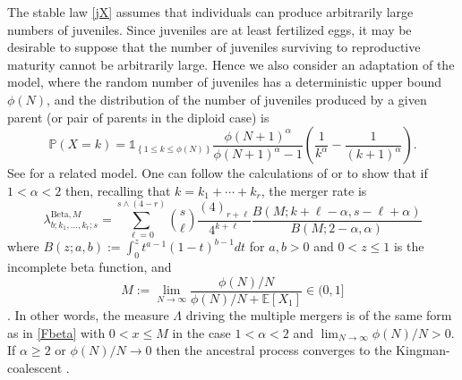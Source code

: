 \documentclass[9pt,twocolumn,twoside,lineno]{gsajnl}
\newcommand{\be}{\begin{equation}}
\newcommand{\ee}{\end{equation}}
\newcommand{\EE}[1]{\ensuremath{\mathds{E}\left[ #1 \right]}}%
\newcommand{\one}[1]{\ensuremath{\mathds{1}_{\left\{ #1 \right\}}}}%
\newcommand{\prb}[1]{\ensuremath{\mathds{P}\left( #1 \right) } }%
\begin{document}
The stable law \eqref{jX} assumes that individuals can produce arbitrarily
large numbers of juveniles. Since juveniles are at least fertilized eggs,
it may be desirable to suppose that the number of juveniles
surviving to reproductive maturity cannot be arbitrarily large.  Hence we also consider
an adaptation of the \cite{schweinsberg03} model, where
the random number of juveniles has a deterministic upper bound $\phi(N)$,
and the distribution of the number of juveniles produced by a given parent
(or pair of parents in the diploid case) is
\be\label{jtr} \prb{X=k} =   \one{1 \le k \le \phi(N)}
\frac{\phi(N+1)^\alpha }{ \phi(N+1)^\alpha - 1 }  \left( \frac{1}{k^\alpha} -
\frac{1}{(k+1)^\alpha}  \right) . \ee
See \citet{Eldon2018} for a related model.   One can follow the calculations of
\cite{schweinsberg03} or \cite{BLS15}  to show  that  if $1 < \alpha < 2$
then, recalling that $k = k_1 + \cdots + k_r$, the merger rate is
 \be \lambda_{b;k_1, \ldots, k_r; s}^{\text{Beta}, M} =  \sum_{\ell = 0}^{ s \wedge (4-r) }
\binom{s}{\ell} \frac{ (4)_{r+\ell} }{4^{k+\ell}} \frac{B(M; k+\ell - \alpha,
s-\ell + \alpha ) }{B(M;2-\alpha,\alpha)}
\ee
where $B(z;a,b) := \int_0^z
t^{a-1}(1-t)^{b-1}dt$ for  $a,b>0$ and $0< z\le 1$ is the incomplete beta function, and
\begin{equation*}
M :=  \lim_{ N \to \infty } \frac{\phi(N) / N}{\phi(N) / N + \EE{X_1}} \in (0, 1]
\end{equation*}
\citep{CDEE2020}.    In other words,  the measure $\Lambda$ driving
the multiple mergers is of the same form as in \eqref{Fbeta}  with $0 < x
\le M$ in the case $1 < \alpha < 2$ and $\lim_{ N \to \infty } \phi(N) / N > 0$.   If $\alpha \ge 2$
or $\phi(N)/N \to 0$ then  the  ancestral process converges to  the Kingman-coalescent
\citep{CDEE2020}.
\end{document}
